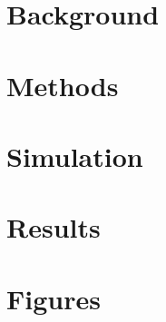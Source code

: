 
\begin{comment}
\frontmatter

\thetitlepage
\cleardoublepage
\setcounter{page}{1}

\section{Abstract}
\uwabstract
\cleardoublepage

\section{Acknowledgments}
I wish to thank my thesis advisor Amalia for her support both in providing input on the direction as well as being a firm advocate on my part in navigating graduate school. It would be unimaginable for me to consider finishing without her support.

My thanks go to my parents Yen and Steve for supporting me throughout the graduate school process and "hanging in there" until the very end. 

\clearpage

\maxtocdepth{subsection}
\tableofcontents\clearpage
\listoffigures\clearpage
\listoftables\clearpage

\mainmatter

\end{comment}
\chapter{Background}

\chapter{Methods}


\chapter{Simulation}

\chapter{Results}

\begin{comment}
\chapter{Discussion}

\chapter{Limitations}

\end{comment}
\chapter{Figures}





